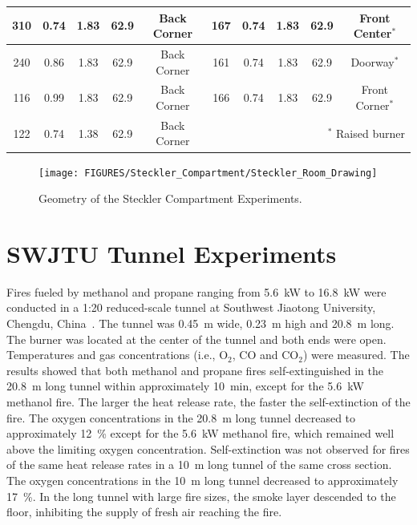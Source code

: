 \begin{table}[h!]
\begin{center}
\begin{tabular}{|c|c|c|c|c||c|c|c|c|c|}
310     & 0.74      & 1.83          &  62.9      & Back Corner  & 167   & 0.74      & 1.83        &  62.9         & Front Center$^*$    \\ \hline
240     & 0.86      & 1.83          &  62.9      & Back Corner  & 161   & 0.74      & 1.83        &  62.9         & Doorway$^*$         \\ \hline
116     & 0.99      & 1.83          &  62.9      & Back Corner  & 166   & 0.74      & 1.83        &  62.9         & Front Corner$^*$    \\ \hline
122     & 0.74      & 1.38          &  62.9      & Back Corner  &  \multicolumn{5}{r|}{$^*$ Raised burner}                   \\ \hline
\end{tabular}
\end{center}
\label{Steckler_Table}
\end{table}


\begin{figure}[!ht]
\texttt{[image: FIGURES/Steckler\_Compartment/Steckler\_Room\_Drawing]}
\caption[Geometry of the Steckler Compartment Experiments]{Geometry of the Steckler Compartment Experiments.}
\label{Steckler_ Drawing}
\end{figure}


\FloatBarrier


\section{SWJTU Tunnel Experiments}
\label{SSJTU_Tunnel_Description}

Fires fueled by methanol and propane ranging from 5.6~kW to 16.8~kW were conducted in a 1:20 reduced-scale tunnel at Southwest Jiaotong University, Chengdu, China~\cite{Wang:TUST2019}. The tunnel was 0.45~m wide, 0.23~m high and 20.8~m long. The burner was located at the center of the tunnel and both ends were open. Temperatures and gas concentrations (i.e., O$_2$, CO and CO$_2$) were measured. The results showed that both methanol and propane fires self-extinguished in the 20.8~m long tunnel within approximately 10~min, except for the 5.6~kW methanol fire. The larger the heat release rate, the faster the self-extinction of the fire. The oxygen concentrations in the 20.8~m long tunnel decreased to approximately 12~\% except for the 5.6~kW methanol fire, which remained well above the limiting oxygen concentration.  Self-extinction was not observed for fires of the same heat release rates in a 10~m long tunnel of the same cross section. The oxygen concentrations in the 10~m long tunnel decreased to approximately 17~\%.  In the long tunnel with large fire sizes, the smoke layer descended to the floor, inhibiting the supply of fresh air reaching the fire.


